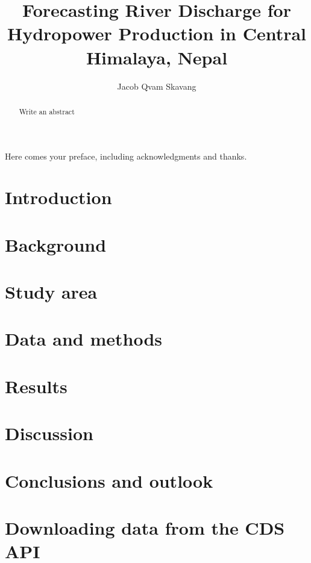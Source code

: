 \documentclass[USenglish]{uiomaster}  %
\author{Jacob Qvam Skavang}
\title{Forecasting River Discharge for Hydropower Production in Central Himalaya, Nepal}
\begin{document}
\uiomasterfp[dept={Department of Geosciences},  %
  program={Hydrology and Glaciology},                        %
  supervisors = {Olga Silantyeva \\ Lena Merete Tallaksen \\ Kristoffer Aalstad}, color = blue, master, long                 %
]                                     %

\frontmatter{}

\begin{abstract}
    Write an abstract
\end{abstract}

\tableofcontents{}
\listoffigures{}
\listoftables{}

\begin{preface}
  Here comes your preface, including acknowledgments and thanks.
\end{preface}

\mainmatter{}

\chapter{Introduction}\label{sec:intro}


\chapter{Background}


\chapter{Study area}


\chapter{Data and methods}


\chapter{Results}


\chapter{Discussion}


\chapter{Conclusions and outlook}


\appendix           %


\chapter{Downloading data from the CDS API}


\backmatter{}
\printbibliography{}
\end{document}
